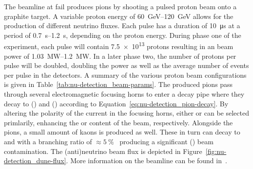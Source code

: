 The beamline at \gls{fail} produces pions by shooting a pulsed proton beam onto a graphite target.
A variable proton energy of \SIrange{60}{120}{\giga\electronvolt} allows for the production of different neutrino fluxes.
Each pulse has a duration of \SI{10}{\micro\second} at a period of \SIrange{0.7}{1.2}{\second}, depending on the proton energy.
During phase one of the experiment, each pulse will contain \num{7.5e13} protons resulting in an beam power of \SIrange{1.03}{1.2}{\mega\watt}.
In a later phase two, the number of protons per pulse will be doubled, doubling the power as well as the average number of events per pulse in the detectors.
A summary of the various proton beam configurations is given in Table~\ref{tab:nu-detection_beam-params}.
The produced pions pass through several electromagnetic focusing horns to enter a decay pipe where they decay to \Pgmp(\Pgmm) and \Pgngm(\Pagngm) according to Equation~\eqref{eq:nu-detection_pion-decay}.
By altering the polarity of the current in the focusing horns, either \Pgpp or \Pgpm can be selected primlarily, enhancing the \Pgngm or \Pagngm content of the beam, respectively.
Alongside the pions, a small amount of kaons is produced as well.
These in turn can decay to \Pgne and \Pagne with a branching ratio of $\approx\SI{5}{\percent}$~\cite{pdg} producing a significant \Pgne (\Pagne) beam contamination.
The (anti)neutrino beam flux is depicted in Figure~\ref{fig:nu-detection_dune-flux}.
More information on the beamline can be found in~\cite{dune2}.

